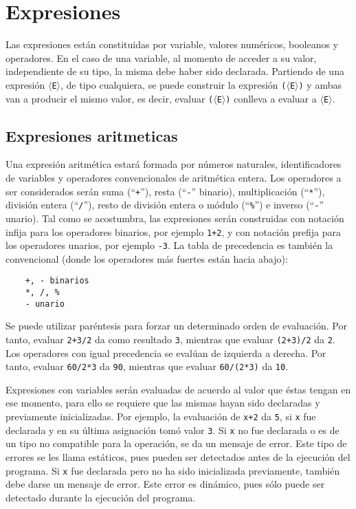 \documentclass[letterpaper,11pt]{article}
\newcommand{\general}[1]{$\langle$\texttt{#1}$\rangle$}
\newcommand{\qt}[1]{``\texttt{#1}''}
\begin{document}
\section{Expresiones}

Las expresiones están constituidas por variable, valores numéricos, booleanos y operadores. En el caso de una variable, al momento de acceder a su valor, independiente de su tipo, la misma debe haber sido declarada. Partiendo de una expresión \general{E}, de tipo cualquiera, se puede construir la expresión \texttt{(}\general{E}\texttt{)} y ambas van a producir el mismo valor, es decir, evaluar \texttt{(}\general{E}\texttt{)} conlleva a evaluar a \general{E}.

\subsection{Expresiones aritmeticas}

Una expresión aritmética estará formada por números naturales, identificadores de variables y operadores convencionales de aritmética entera. Los operadores a ser considerados serán suma (\qt{+}), resta (\qt{-} binario), multiplicación (\qt{*}), división entera (\qt{/}), resto de división entera o módulo (\qt{\%}) e inverso (\qt{-} unario). Tal como se acostumbra, las expresiones serán construidas con notación infija para los operadores binarios, por ejemplo \texttt{1+2}, y con notación prefija para los operadores unarios, por ejemplo \texttt{-3}. La tabla de precedencia es también la convencional (donde los operadores más fuertes están hacia abajo):

\begin{lstlisting}
    +, - binarios
    *, /, %
    - unario    
\end{lstlisting}

Se puede utilizar paréntesis para forzar un determinado orden de evaluación. Por tanto, evaluar \texttt{2+3/2} da como resultado \texttt{3}, mientras que evaluar \texttt{(2+3)/2} da \texttt{2}. Los operadores con igual precedencia se evalúan de izquierda a derecha. Por tanto, evaluar \texttt{60/2*3} da \texttt{90}, mientras que evaluar \texttt{60/(2*3)} da \texttt{10}.


Expresiones con variables serán evaluadas de acuerdo al valor que éstas tengan en ese momento, para ello se requiere que las mismas hayan sido declaradas y previamente inicializadas. Por ejemplo, la evaluación de \texttt{x+2} da \texttt{5}, si \texttt{x} fue declarada y en su última asignación tomó valor \texttt{3}. Si \texttt{x} no fue declarada o es de un tipo no compatible para la operación, se da un mensaje de error. Este tipo de errores se les llama estáticos, pues pueden ser detectados antes de la ejecución del programa. Si \texttt{x} fue declarada pero no ha sido inicializada previamente, también debe darse un mensaje de error. Este error es dinámico, pues sólo puede ser detectado durante la ejecución del programa.
\end{document}
